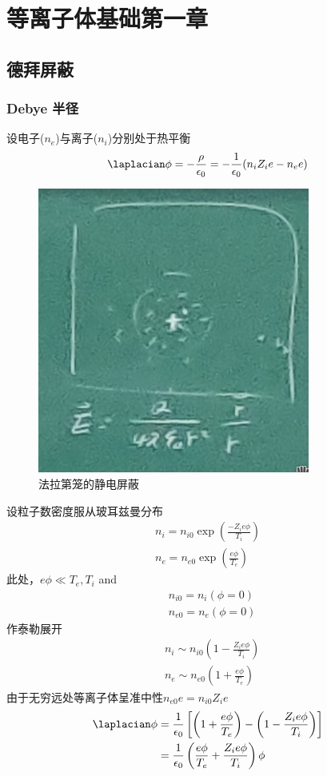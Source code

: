 
\section{等离子体基础第一章}
\subsection{德拜屏蔽}
\subsubsection{Debye 半径}
设电子(\(n_e\))与离子(\(n_i\))分别处于热平衡
\begin{equation}
  \laplacian \phi = - \frac{\rho}{\epsilon_0} = - \frac{1}{\epsilon_0} (  n_i Z_i e - n_e e )
\end{equation}
\begin{figure}[htpb]
  \centering
  \includegraphics[width=0.3\linewidth]{figures/2022-09-09T221136+0800.png}
  \caption{法拉第笼的静电屏蔽}%
\end{figure}
设粒子数密度服从玻耳兹曼分布
\begin{gather}
  n_i = n_{i0} \exp(\frac{- Z_i e \phi}{T_i}) \\
  n_e = n_{e0} \exp(\frac{e \phi}{T_e})
\end{gather}
此处，\(e\phi \ll T_e, T_i\) and
\begin{align*}
  & n_{i 0 } = n_i (\phi = 0 ) \\
  & n_{e 0} = n_e (\phi = 0 )
\end{align*}
作泰勒展开
\begin{align*}
  & n_i \sim n_{i 0} \left(1 - \frac{Z_i e \phi}{T_i}\right) \\
  & n_e \sim n_{e 0} \left(1 + \frac{ e \phi}{T_e}\right)
\end{align*}
由于无穷远处等离子体呈准中性\(n_{e 0} e = n_{i 0} Z_i e\)
\begin{equation}
  \begin{aligned}
    \laplacian \phi &= \frac{1}{\epsilon_0} \left[
\left(1 + \frac{ e \phi}{T_e}\right)
- \left(1 - \frac{Z_i e \phi}{T_i}\right)\right] \\
                    &=
\frac{1}{\epsilon_0}\left(
\frac{ e \phi}{T_e} +
\frac{Z_i e \phi}{T_i}
\right)\phi
  \end{aligned}
\end{equation}
